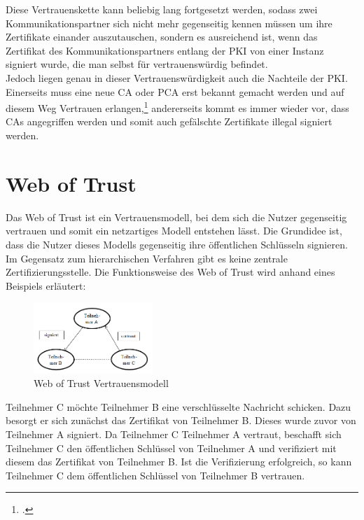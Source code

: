 \documentclass  [paper=a4,
				fontsize=12pt,
				listof=totoc,
				bibliography=totoc
				]{scrreprt}
\begin{document}
			Diese Vertrauenskette kann beliebig lang fortgesetzt werden, sodass zwei Kommunikationspartner sich nicht mehr gegenseitig kennen müssen um ihre Zertifikate einander auszutauschen, sondern es ausreichend ist, wenn das Zertifikat des Kommunikationspartners entlang der \ac{PKI} von einer Instanz signiert wurde, die man selbst für vertrauenswürdig befindet.\medskip\\
			Jedoch liegen genau in dieser Vertrauenswürdigkeit auch die Nachteile der \ac{PKI}. Einerseits muss eine neue \ac{CA} oder \ac{PCA} erst bekannt gemacht werden und auf diesem Weg Vertrauen erlangen,\footcite[Vgl.][S. 24]{Schwenk} andererseits kommt es immer wieder vor, dass \ac{CA}s angegriffen werden und somit auch gefälschte Zertifikate illegal signiert werden.
			\newpage	
	
		\section{Web of Trust}
			Das Web of Trust ist ein Vertrauensmodell, bei dem sich die Nutzer gegenseitig vertrauen und somit ein netzartiges Modell entstehen lässt. Die Grundidee ist, dass die Nutzer dieses Modells gegenseitig ihre öffentlichen Schlüsseln signieren. Im Gegensatz zum hierarchischen Verfahren gibt es keine zentrale Zertifizierungsstelle.
			Die Funktionsweise des Web of Trust wird anhand eines Beispiels erläutert:
			
			\begin{figure}
			\centering
				\includegraphics[width=0.4\textwidth]{images/WOT.png}
			\caption[Web of Trust Vertrauensmodell]{Web of Trust Vertrauensmodell\footnotemark}
			\end{figure}
			Teilnehmer C möchte Teilnehmer B eine verschlüsselte Nachricht schicken. Dazu besorgt er sich zunächst das Zertifikat von Teilnehmer B. Dieses wurde zuvor von Teilnehmer A signiert. Da Teilnehmer C Teilnehmer A vertraut, beschafft sich Teilnehmer C den öffentlichen Schlüssel von Teilnehmer A und verifiziert mit diesem das Zertifikat von Teilnehmer B. Ist die Verifizierung erfolgreich, so kann Teilnehmer C dem öffentlichen Schlüssel von Teilnehmer B vertrauen.
			
\end{document}
